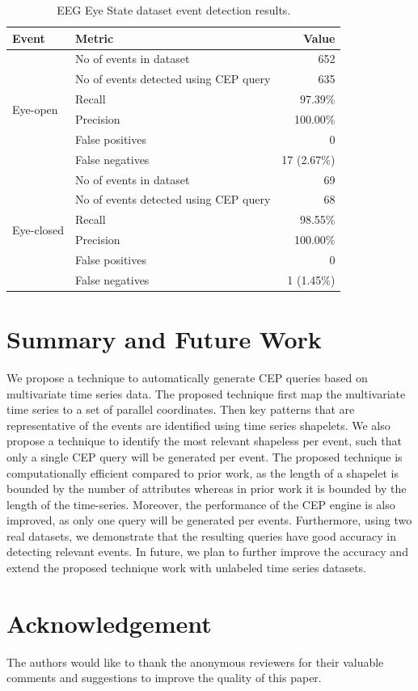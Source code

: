 \documentclass[conference]{IEEEtran}  %
\makeatletter
\newcommand*{\rom}[1]{\expandafter\@slowromancap\romannumeral #1@}
\makeatother
\begin{document}

\begin{table}
\caption{EEG Eye State dataset event detection results.}
\begin{tabular}{ |l|l|l| }
\hline
\textbf{Event} & \textbf{Metric} & \multicolumn{1}{|r|}{\textbf{Value}}\\
\hline
\multirow{6}{*}{Eye-open} & No of events in dataset & \multicolumn{1}{|r|}{652}\\
    & No of events detected using CEP query & \multicolumn{1}{|r|}{635}\\ 
    & Recall & \multicolumn{1}{|r|}{97.39\%}\\
    & Precision & \multicolumn{1}{|r|}{100.00\%}\\
    & False positives & \multicolumn{1}{|r|}{0}\\
    & False negatives & \multicolumn{1}{|r|}{17 (2.67\%)}\\
\hline
\multirow{6}{*}{Eye-closed} & No of events in dataset & \multicolumn{1}{|r|}{69}\\
    & No of events detected using CEP query & \multicolumn{1}{|r|}{68}\\
    & Recall & \multicolumn{1}{|r|}{98.55\%}\\
    & Precision & \multicolumn{1}{|r|}{100.00\%}\\
    & False positives & \multicolumn{1}{|r|}{0}\\
    & False negatives & \multicolumn{1}{|r|}{1 (1.45\%)}\\
\hline
\end{tabular}
\squeezeup\squeezeup
\end{table}

\section{Summary and Future Work}
We propose a technique to automatically generate CEP queries based on multivariate time series data. The proposed technique first map the multivariate time series to a set of parallel coordinates. Then key patterns that are representative of the events are identified using time series shapelets. We also propose a technique to identify the most relevant shapeless per event, such that only a single CEP query will be generated per event. The proposed technique is computationally efficient compared to prior work, as the length of a shapelet is bounded by the number of attributes whereas in prior work it is bounded by the length of the time-series. Moreover, the performance of the CEP engine is also improved, as only one query will be generated per events. Furthermore, using two real datasets, we demonstrate that the resulting queries have good accuracy in detecting relevant events. In future, we plan to further improve the accuracy and extend the proposed technique work with unlabeled time series datasets.

\section*{Acknowledgement}
The authors would like to thank the anonymous reviewers for their valuable comments and suggestions to improve the quality of this paper.

\nocite{*}


\end{document}
